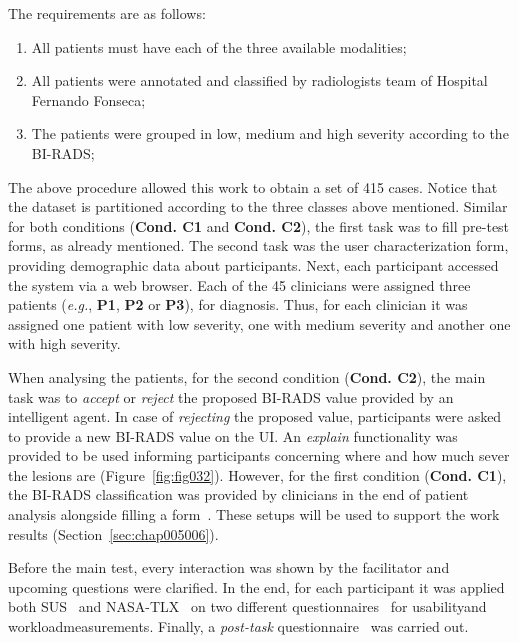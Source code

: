 \hfill

\noindent
The requirements are as follows:

\begin{enumerate}
\item All patients must have each of the three available modalities;
\item All patients were annotated and classified by radiologists team of Hospital Fernando Fonseca;
\item The patients were grouped in low, medium and high severity according to the \ac{BI-RADS};
\end{enumerate}

The above procedure allowed this work to obtain a set of 415 cases.
Notice that the dataset is partitioned according to the three classes above mentioned.
Similar for both conditions ({\bf Cond. C1} and {\bf Cond. C2}), the first task was to fill pre-test forms, as already mentioned.
The second task was the user characterization form, providing demographic data about participants.
Next, each participant accessed the system via a web browser.
Each of the 45 clinicians were assigned three patients ({\it e.g.}, {\bf P1}, {\bf P2} or {\bf P3}), for diagnosis.
Thus, for each clinician it was assigned one patient with low severity, one with medium severity and another one with high severity.

When analysing the patients, for the second condition ({\bf Cond. C2}), the main task was to {\it accept} or {\it reject} the proposed \ac{BI-RADS} value provided by an intelligent agent.
In case of {\it rejecting} the proposed value, participants were asked to provide a new \ac{BI-RADS} value on the \ac{UI}.
An {\it explain} functionality was provided to be used informing participants concerning where and how much sever the lesions are (Figure~\ref{fig:fig032}).
However, for the first condition ({\bf Cond. C1}), the \ac{BI-RADS} classification was provided by clinicians in the end of patient analysis alongside filling a form~\cite{https://doi.org/10.13140/rg.2.2.36306.86725}.
These setups will be used to support the work results (Section~\ref{sec:chap005006}).

Before the main test, every interaction was shown by the facilitator and upcoming questions were clarified.
In the end, for each participant it was applied both \ac{SUS}~\cite{Tyllinen:2016:WNN:2858036.2858570} and \ac{NASA-TLX}~\cite{ramkumar2017using, grier2015high} on two different questionnaires~\cite{https://doi.org/10.13140/rg.2.2.25301.06883, https://doi.org/10.13140/rg.2.2.26978.79044} for usability\footnotemark[21] and workload\footnotemark[22] measurements.
Finally, a {\it post-task} questionnaire~\cite{https://doi.org/10.13140/rg.2.2.16566.14403/1} was carried out.

